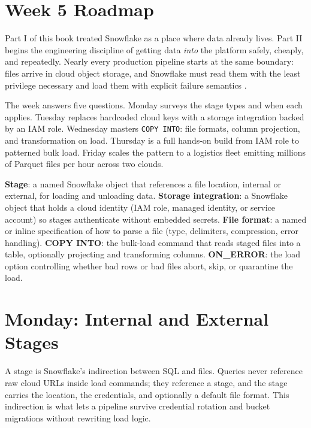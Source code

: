 \section{Week 5 Roadmap}
Part I of this book treated Snowflake as a place where data already lives. Part II begins the engineering discipline of getting data \emph{into} the platform safely, cheaply, and repeatedly. Nearly every production pipeline starts at the same boundary: files arrive in cloud object storage, and Snowflake must read them with the least privilege necessary and load them with explicit failure semantics \cite{snowflakeDataLoadDocs}.

The week answers five questions. Monday surveys the stage types and when each applies. Tuesday replaces hardcoded cloud keys with a storage integration backed by an IAM role. Wednesday masters \texttt{COPY INTO}: file formats, column projection, and transformation on load. Thursday is a full hands-on build from IAM role to patterned bulk load. Friday scales the pattern to a logistics fleet emitting millions of Parquet files per hour across two clouds.

\begin{keyterms}
\textbf{Stage}: a named Snowflake object that references a file location, internal or external, for loading and unloading data.\quad
\textbf{Storage integration}: a Snowflake object that holds a cloud identity (IAM role, managed identity, or service account) so stages authenticate without embedded secrets.\quad
\textbf{File format}: a named or inline specification of how to parse a file (type, delimiters, compression, error handling).\quad
\textbf{COPY INTO}: the bulk-load command that reads staged files into a table, optionally projecting and transforming columns.\quad
\textbf{ON\_ERROR}: the load option controlling whether bad rows or bad files abort, skip, or quarantine the load.
\end{keyterms}

\section{Monday: Internal and External Stages}
A stage is Snowflake's indirection between SQL and files. Queries never reference raw cloud URLs inside load commands; they reference a stage, and the stage carries the location, the credentials, and optionally a default file format. This indirection is what lets a pipeline survive credential rotation and bucket migrations without rewriting load logic.

